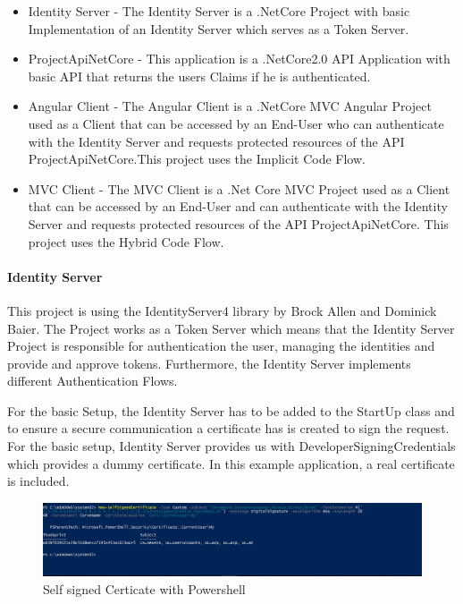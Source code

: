 \begin{itemize}
	\item Identity Server - The Identity Server is a .NetCore Project with basic Implementation of an Identity Server which serves as a Token Server. 
	\item ProjectApiNetCore - This application is a .NetCore2.0 API Application with basic API that returns the users Claims if he is authenticated.
	\item Angular Client - The Angular Client is a .NetCore MVC Angular Project used as a Client that can be accessed by an End-User who can authenticate with the Identity Server and requests protected resources of the API ProjectApiNetCore.This project uses the Implicit Code Flow. 
	\item MVC Client - The MVC Client is a .Net Core MVC Project used as a Client that can be accessed by an End-User and can authenticate with the Identity Server and requests protected resources of the API ProjectApiNetCore. This project uses the Hybrid Code Flow. 
\end{itemize}



\paragraph{Identity Server}

This project is using the IdentityServer4 library by Brock Allen and Dominick Baier. The Project works as a Token Server which means that the Identity Server Project is responsible for authentication the user, managing the identities and provide and approve tokens. Furthermore, the Identity Server implements different Authentication Flows. 


For the basic Setup, the Identity Server has to be added to the StartUp class and to ensure a secure communication a certificate has is created to sign the request. For the basic setup, Identity Server provides us with DeveloperSigningCredentials which provides a dummy certificate. In this example application, a real certificate is included. 

\begin{figure}[h]
	\centering
	\includegraphics[width=0.8\linewidth]{images/self-signed-certicate}
	\caption{Self signed Certicate with Powershell}
	\label{fig:self-signed-certicate}
\end{figure}

